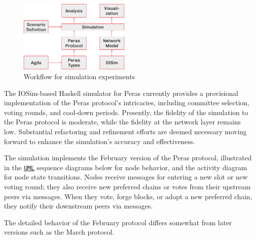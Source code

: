 \documentclass[10pt]{article}
\begin{document}
\begin{figure}
\centering
\includegraphics[width=0.48\textwidth]{../diagrams/sim-expts/sim-workflow.png}
\caption{Workflow for simulation experiments}
\end{figure}

The IOSim-based Haskell simulator for Peras currently provides a
provisional implementation of the Peras protocol's intricacies,
including committee selection, voting rounds, and cool-down periods.
Presently, the fidelity of the simulation to the Peras protocol is
moderate, while the fidelity at the network layer remains low.
Substantial refactoring and refinement efforts are deemed necessary
moving forward to enhance the simulation's accuracy and effectiveness.

The simulation implements the February version of the Peras protocol,
illustrated in the
\href{https://en.wikipedia.org/wiki/Unified_Modeling_Language}{\color{blue}\texttt{UML}}
sequence diagrams below for node behavior, and the activity diagram for
node state transitions. Nodes receive messages for entering a new slot
or new voting round; they also receive new preferred chains or votes
from their upstream peers via messages. When they vote, forge blocks, or
adopt a new preferred chain, they notify their downstream peers via
messages.

\begin{quoting}
The detailed behavior of the February protocol differs
somewhat from later versions such as the March protocol.
\end{quoting}
\end{document}

